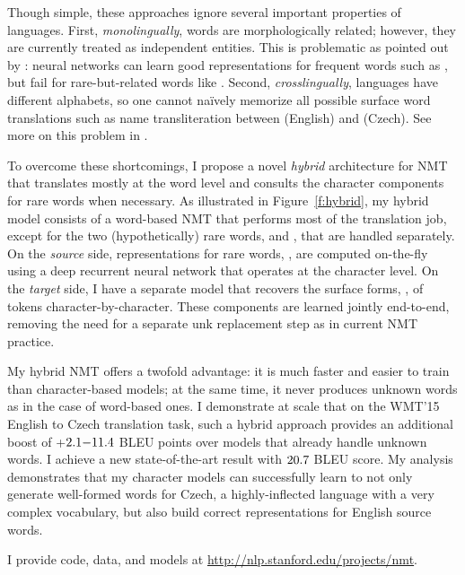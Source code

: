 Though simple, these approaches ignore several important
properties of languages. First, {\it monolingually}, words are morphologically
related; however, they are currently treated as independent entities. This is
problematic as pointed out by
: neural networks can learn good
representations for frequent words such as , but fail for
rare-but-related words like . Second, {\it crosslingually},
languages have different alphabets, so one cannot na\"{i}vely memorize all
possible surface word translations such as name transliteration between 
 (English) and  (Czech). See more on this problem
in \cite{sennrich16sub}.

To overcome these shortcomings, I propose a novel {\it hybrid} architecture for NMT
that translates mostly at the word level and consults the character
components for rare words when necessary. As illustrated in
Figure~\ref{f:hybrid}, my hybrid model consists of a word-based NMT that
performs most of the translation job, except for the two (hypothetically) rare words,
 and , that are handled separately. On the {\it source}
side, representations for rare words, , are
computed on-the-fly using a deep recurrent neural network that operates at the
character level. On the {\it target} side, I have a separate model that
recovers the surface forms, , of \unk{} tokens character-by-character.
These components are learned jointly end-to-end, removing the need for a separate
unk replacement step as in current NMT practice.

My hybrid NMT offers a twofold advantage: it is much faster and easier to
train than character-based models; at the same time, it never produces unknown
words as in the case of word-based ones.
I demonstrate at scale that on the WMT'15 English to
Czech translation task, such a hybrid approach provides
an additional boost of +$2.1{-}11.4{}$ BLEU points over models 
that already handle unknown words.
I achieve a new state-of-the-art result with
$20.7{}$ BLEU score.
My analysis demonstrates that my character models can successfully learn to not
only generate well-formed words for Czech, a
highly-inflected language with a very complex vocabulary, but also build correct
representations for English source words.

I provide code, data, and models at \url{http://nlp.stanford.edu/projects/nmt}.

